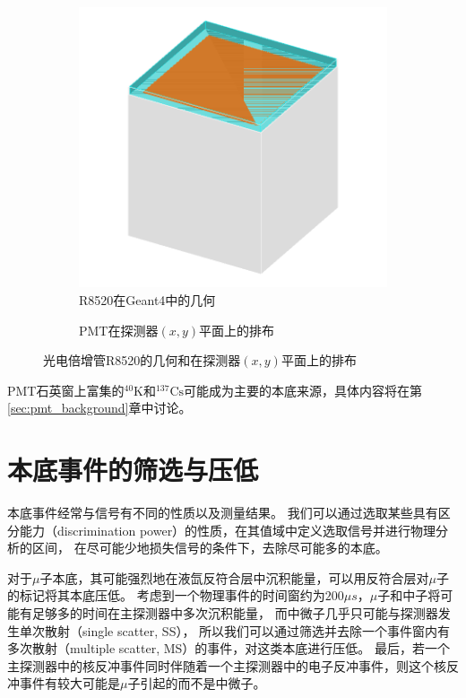 \begin{figure}
  \begin{subfigure}{.53\textwidth}
    \centering
    \includegraphics[width=1.0\linewidth]{figures/pmt_geo.png}
    \caption{\label{fig:pmt_g4} R8520在Geant4中的几何}
  \end{subfigure}
  \begin{subfigure}{.47\textwidth}
    \centering
    
    \caption{\label{fig:pmt_layout} PMT在探测器$(x,y)$平面上的排布}
  \end{subfigure}
  \caption{\label{fig:pmt_geo} 光电倍增管R8520的几何和在探测器$(x,y)$平面上的排布}
\end{figure}

PMT石英窗上富集的${}^{40}\mathrm{K}$和${}^{137}\mathrm{Cs}$可能成为主要的本底来源，具体内容将在第\ref{sec:pmt_background}章中讨论。

\section{本底事件的筛选与压低}

本底事件经常与信号有不同的性质以及测量结果。
我们可以通过选取某些具有区分能力（discrimination power）的性质，在其值域中定义选取信号并进行物理分析的区间，
在尽可能少地损失信号的条件下，去除尽可能多的本底。

对于$\mu$子本底，其可能强烈地在液氙反符合层中沉积能量，可以用反符合层对$\mu$子的标记将其本底压低。
考虑到一个物理事件的时间窗约为$200\mu s$，$\mu$子和中子将可能有足够多的时间在主探测器中多次沉积能量，
而中微子几乎只可能与探测器发生单次散射（single scatter, SS），
所以我们可以通过筛选并去除一个事件窗内有多次散射（multiple scatter, MS）的事件，对这类本底进行压低。
最后，若一个主探测器中的核反冲事件同时伴随着一个主探测器中的电子反冲事件，则这个核反冲事件有较大可能是$\mu$子引起的而不是中微子。

